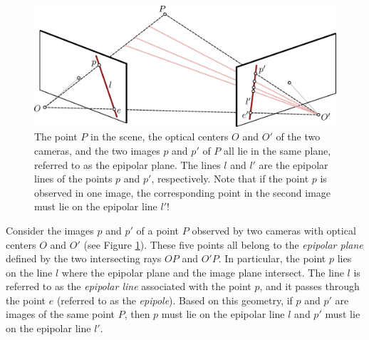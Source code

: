 \begin{figure}[ht]
  \begin{center}
	\includegraphics[width=.8\textwidth]{tex/figs/ch09_figs/stereo.png}
  \end{center}
  \caption{The point $P$ in the scene, the optical centers $O$ and $O'$ of the two cameras, and the two images $p$ and $p'$ of $P$ all lie in the same plane, referred to as the epipolar plane. The lines $l$ and $l'$ are the epipolar lines of the points $p$ and $p'$, respectively. Note that if the point $p$ is observed in one image, the corresponding point in the second image must lie on the epipolar line $l'$!}
  \label{fig:epi}
\end{figure}

Consider the images $p$ and $p'$ of a point $P$ observed by two cameras with optical centers $O$ and $O'$ (see Figure \ref{fig:epi}). These five points all belong to the \textit{epipolar plane} defined by the two intersecting rays $OP$ and $O'P$. 
In particular, the point $p$ lies on the line $l$ where the epipolar plane and the image plane intersect. The line $l$ is referred to as the \textit{epipolar line} associated with the point $p$, and it passes through the point $e$ (referred to as the \textit{epipole}).
Based on this geometry, if $p$ and $p'$ are images of the same point $P$, then $p$ must lie on the epipolar line $l$ and $p'$ must lie on the epipolar line $l'$. 

